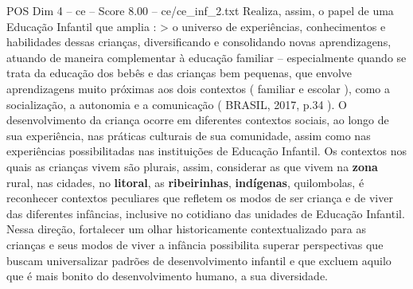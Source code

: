 \begin{textsample}{POS Dim 4 – ce – Score 8.00 – ce/ce\_inf\_2.txt}
Realiza, assim, o papel de uma Educação Infantil que amplia : > o universo de experiências, conhecimentos e habilidades dessas crianças, diversificando e consolidando novas aprendizagens, atuando de maneira complementar à educação familiar – especialmente quando se trata da educação dos bebês e das crianças bem pequenas, que envolve aprendizagens muito próximas aos dois contextos ( familiar e escolar ), como a socialização, a autonomia e a comunicação ( BRASIL, 2017, p.34 ).
O desenvolvimento da criança ocorre em diferentes contextos sociais, ao longo de sua experiência, nas práticas culturais de sua comunidade, assim como nas experiências possibilitadas nas instituições de Educação Infantil.
Os contextos nos quais as crianças vivem são plurais, assim, considerar as que vivem na \textbf{zona} rural, nas cidades, no \textbf{litoral}, as \textbf{ribeirinhas}, \textbf{indígenas}, quilombolas, é reconhecer contextos peculiares que refletem os modos de ser criança e de viver das diferentes infâncias, inclusive no cotidiano das unidades de Educação Infantil.
Nessa direção, fortalecer um olhar historicamente contextualizado para as crianças e seus modos de viver a infância possibilita superar perspectivas que buscam universalizar padrões de desenvolvimento infantil e que excluem aquilo que é mais bonito do desenvolvimento humano, a sua diversidade.

\end{textsample}
